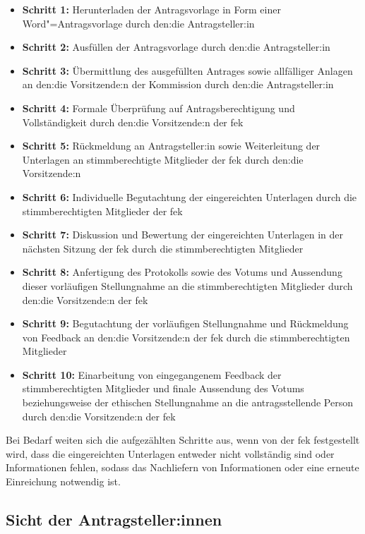 \documentclass[a4paper,12pt,twoside]{scrreprt}
\begin{document}
\begin{itemize}
    \item \textbf{Schritt 1:} Herunterladen der Antragsvorlage in Form einer Word"=Antragsvorlage durch den:die Antragsteller:in
    \item \textbf{Schritt 2:} Ausfüllen der Antragsvorlage durch den:die Antragsteller:in
    \item \textbf{Schritt 3:} Übermittlung des ausgefüllten Antrages sowie allfälliger Anlagen an den:die Vorsitzende:n der Kommission durch den:die Antragsteller:in
    \item \textbf{Schritt 4:} Formale Überprüfung auf Antragsberechtigung und Vollständigkeit durch den:die Vorsitzende:n der \ac{fek}
    \item \textbf{Schritt 5:} Rückmeldung an Antragsteller:in sowie Weiterleitung der Unterlagen an stimmberechtigte Mitglieder der \ac{fek} durch den:die Vorsitzende:n
    \item \textbf{Schritt 6:} Individuelle Begutachtung der eingereichten Unterlagen durch die stimmberechtigten Mitglieder der \ac{fek}
    \item \textbf{Schritt 7:} Diskussion und Bewertung der eingereichten Unterlagen in der nächsten Sitzung der \ac{fek} durch die stimmberechtigten Mitglieder
    \item \textbf{Schritt 8:} Anfertigung des Protokolls sowie des Votums und Aussendung dieser vorläufigen Stellungnahme an die stimmberechtigten Mitglieder durch den:die Vorsitzende:n der \ac{fek}
    \item \textbf{Schritt 9:} Begutachtung der vorläufigen Stellungnahme und Rückmeldung von Feedback an den:die Vorsitzende:n der \ac{fek} durch die stimmberechtigten Mitglieder
    \item \textbf{Schritt 10:} Einarbeitung von eingegangenem Feedback der stimmberechtigten Mitglieder und finale Aussendung des Votums beziehungsweise der ethischen Stellungnahme an die antragsstellende Person durch den:die Vorsitzende:n der \ac{fek}
\end{itemize}

Bei Bedarf weiten sich die aufgezählten Schritte aus, wenn von der \ac{fek} festgestellt wird, dass die eingereichten Unterlagen entweder nicht vollständig sind oder Informationen fehlen, sodass das Nachliefern von Informationen oder eine erneute Einreichung notwendig ist.

\subsection{Sicht der Antragsteller:innen}
\label{sub-sec:ablauf-sicht-Antragsteller}
\end{document}
